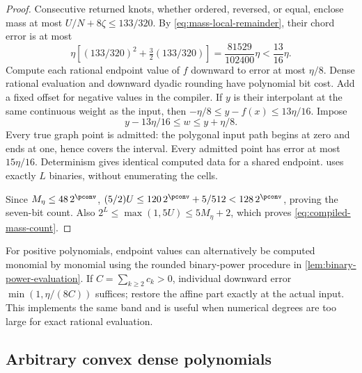 \begin{proof}
Consecutive returned knots, whether ordered, reversed, or equal, enclose
mass at most $U/N+8\zeta\le133/320$. By
\eqref{eq:mass-local-remainder}, their chord error is at most
\[
 \eta\left[(133/320)^2+\tfrac32(133/320)\right]
 =\frac{81529}{102400}\eta<\frac{13}{16}\eta.
\]
Compute each rational endpoint value of $f$ downward to error at most
$\eta/8$. Dense rational evaluation and downward dyadic rounding have
polynomial bit cost. Add a fixed offset for negative values in the
compiler. If $y$ is their interpolant at the same continuous weight as
the input, then $-\eta/8\le y-f(x)\le13\eta/16$. Impose
\begin{equation}\label{eq:compiled-scalar-band}
 y-13\eta/16\le w\le y+\eta/8.
\end{equation}
Every true graph point is admitted: the polygonal input path begins
at zero and ends at one, hence covers the interval. Every admitted
point has error at most $15\eta/16$. Determinism gives identical
computed data for a shared endpoint. 
uses exactly $L$ binaries, without enumerating the cells.

Since $M_\eta\le48\,2^{\pconv}$,
$(5/2)U\le120\,2^{\pconv}+5/512<128\,2^{\pconv}$, proving
the seven-bit count. Also $2^L\le\max(1,5U)\le5M_\eta+2$,
which proves \eqref{eq:compiled-mass-count}.
\end{proof}

For positive polynomials, endpoint values can alternatively be computed
monomial by monomial using the rounded binary-power procedure in
\cref{lem:binary-power-evaluation}. If $C=\sum_{k\ge2}c_k>0$,
individual downward error $\min(1,\eta/(8C))$ suffices; restore the
affine part exactly at the actual input. This implements the same band
and is useful when numerical degrees are too large for exact rational
evaluation.

\subsection{Arbitrary convex dense polynomials}

